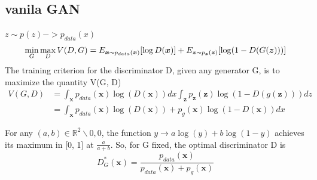 \subsection{vanila GAN}
$z \sim p(z) -> p_{data}(x)$
\begin{equation}
    \min_G \max_D V(D, G) = E_{\boldsymbol{x} \thicksim p_{data}(\boldsymbol{x})}[\log D(\boldsymbol{x})] + E_{\boldsymbol{z} \thicksim p_{\boldsymbol{z}}(\boldsymbol{z})}[\log (1 - D(G(\boldsymbol{z})))]
\end{equation}
The training criterion for the discriminator D, given any generator G, is to maximize the
quantity V(G, D)
\begin{equation}
    \begin{split}
        V(G, D) &= \int_{\boldsymbol{x}} p_{data}(\boldsymbol{x}) \log (D(\boldsymbol{x})) dx \int_{\boldsymbol{z}} p_{\boldsymbol{z}}(\boldsymbol{z}) \log(1 - D(g(\boldsymbol{z})))dz \\
        &= \int_{\boldsymbol{x}} p_{data}(\boldsymbol{x}) \log(D(\boldsymbol{x})) + p_g(\boldsymbol{x}) \log (1 - D(\boldsymbol{x})) dx
    \end{split}
\end{equation}

For any $(a, b) \in \mathbb{R}^2 \backslash {0, 0}$, the function $ y \to a\log(y) + b\log(1 - y)$
achieves its maximum in [0, 1] at $\frac{a}{a + b}$.
So, for G fixed, the optimal discriminator D is
\begin{equation}
    D_{G}^{*}(\boldsymbol{x}) = \frac{p_{data}(\boldsymbol{x})}{p_{data}(\boldsymbol{x}) + p_g(\boldsymbol{x})}
\end{equation}

